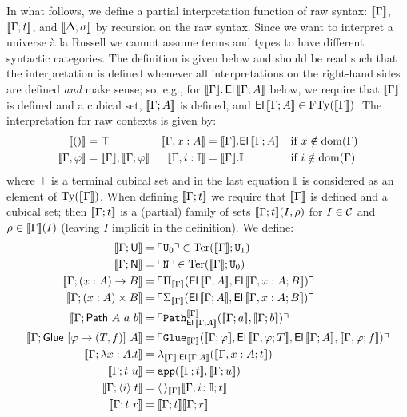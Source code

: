 In what follows, we define a partial interpretation function of raw
syntax: $[\![\Gamma]\!]$, $[\![\Gamma;t]\!]$, and $[\![\Delta;\sigma]\!]$ by
recursion on the raw syntax.  Since we want to interpret a universe
\`a la Russell we cannot assume terms and types to have different
syntactic categories.  The definition is given
below and should be read such that the interpretation is defined
whenever all interpretations on the right-hand sides are defined
\emph{and} make sense; so, e.g., for
$[\![\Gamma]\!].\operatorname{\mathsf{El}}{[\![\Gamma;A]\!]}$ below, we require that
$[\![\Gamma]\!]$ is defined and a cubical set, ${[\![\Gamma;A]\!]}$ is
defined, and $\operatorname{\mathsf{El}}{[\![\Gamma;A]\!]} \in \operatorname{FTy} ([\![\Gamma]\!])$.  The
interpretation for raw contexts is given by:
\begin{align*}
  \den{\emptyctxt} &= \top %
  & %
  \den{\Gamma, x : A} &= \den{\Gamma}.\!\El{\den{\Gamma; A}} &&
  \text{if } x \notin \dom(\Gamma)
  \\
  \den{\Gamma,\varphi} &= \den{\Gamma},\den{\Gamma;\varphi}
  & %
  \den{\Gamma, i : \II} &= \den{\Gamma}.\II && \text{if } i
  \notin \dom(\Gamma)
\end{align*}
where $\top$ is a terminal cubical set and in the last equation $\mathbb{I}$
is considered as an element of $\operatorname{Ty} ([\![\Gamma]\!])$.  When defining
$[\![\Gamma;t]\!]$ we require that $[\![\Gamma]\!]$ is defined and a
cubical set; then $[\![\Gamma;t]\!]$ is a (partial) family of sets
$[\![\Gamma;t]\!] (I,\rho)$ for $I\in \mathcal{C}$ and $\rho \in [\![\Gamma]\!]
(I)$ (leaving $I$ implicit in the definition).  We define:
\begingroup
\allowdisplaybreaks
\begin{align*}
  \den{\Gamma;\U} &= \code {\UU_0} \in \Ter (\den{\Gamma};\UU_1)
  \\
  \den{\Gamma;\NN} &= \code {\sNN} \in \Ter (\den{\Gamma};\UU_0)
  \\
  \den{\Gamma; (x:A) \to B} &= %
  \code {\Pi_{\den{\Gamma}} (\El {\den{\Gamma;A}},\El {\den{\Gamma,
        x : A; B}})}
  \\
  \den{\Gamma; (x:A) \times B} &= %
  \code {\Sigma_{\den{\Gamma}} (\El {\den{\Gamma;A}},\El
    {\den{\Gamma, x : A; B}})}
  \\
  \den{\Gamma;\Path~A~a~b} &= %
  \code {\sPath^{\den{\Gamma}}_{\El
      {\den{\Gamma;A}}}(\den{\Gamma;a},\den{\Gamma;b})}
  \\
  \den{\Gamma;\Glue~[\varphi \mapsto (T,\myeq{})]~A} &= \code
  {\sGlue_{\den{\Gamma}} (\den{\Gamma;\varphi},
    \El{\den{\Gamma,\varphi;T}},\El{\den{\Gamma;A}},
    \den{\Gamma,\varphi;\myeq{}})}
  \\
  \den{\Gamma; \lambda x : A. t} &= %
  \lambda_{\den{\Gamma};\El {\den{\Gamma;A}}} (\den{\Gamma,x : A; t})
  \\
  \den{\Gamma; t ~ u} &= \app(\den {\Gamma;t}, \den {\Gamma; u})
  \\
  \den{\Gamma; \pabs i t} &= \spabs_{\den{\Gamma}} \den{\Gamma,
    i\colon \II; t}
  \\
  \den{\Gamma; t ~ r} &= \den{\Gamma;t} \den{\Gamma;r}
\end{align*}%
